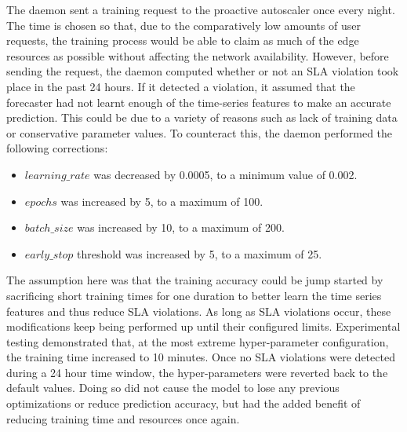 The daemon sent a training request to the proactive autoscaler once every night. The time is chosen so that, due to the comparatively low amounts of user requests, the training process would be able to claim as much of the edge resources as possible without affecting the network availability. However, before sending the request, the daemon computed whether or not an SLA violation took place in the past 24 hours. If it detected a violation, it assumed that the forecaster had not learnt enough of the time-series features to make an accurate prediction. This could be due to a variety of reasons such as lack of training data or conservative parameter values. To counteract this, the daemon performed the following corrections:

\begin{itemize}
    \item $learning\_rate$ was decreased by 0.0005, to a minimum value of 0.002.
    \item $epochs$ was increased by 5, to a maximum of 100.
    \item $batch\_size$ was increased by 10, to a maximum of 200.
    \item $early\_stop$ threshold was increased by 5, to a maximum of 25.
\end{itemize}

The assumption here was that the training accuracy could be jump started by sacrificing short training times for one duration to better learn the time series features and thus reduce SLA violations. As long as SLA violations occur, these modifications keep being performed up until their configured limits. Experimental testing demonstrated that, at the most extreme hyper-parameter configuration, the training time increased to 10 minutes. Once no SLA violations were detected during a 24 hour time window, the hyper-parameters were reverted back to the default values. Doing so did not cause the model to lose any previous optimizations or reduce prediction accuracy, but had the added benefit of reducing training time and resources once again.